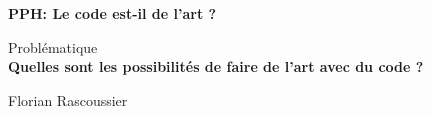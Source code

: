 \begin{titlepage}
    \begin{center}
        \vspace{2cm}

        \Large
        \textbf{PPH: Le code est-il de l'art ?}

        \vspace{2cm}
        \Large
        Problématique\\
        \textbf{Quelles sont les possibilités de faire de l'art avec du code ?}
            
        \vspace{2cm}
        \normalsize
        Florian Rascoussier
        
    \end{center}
\end{titlepage}